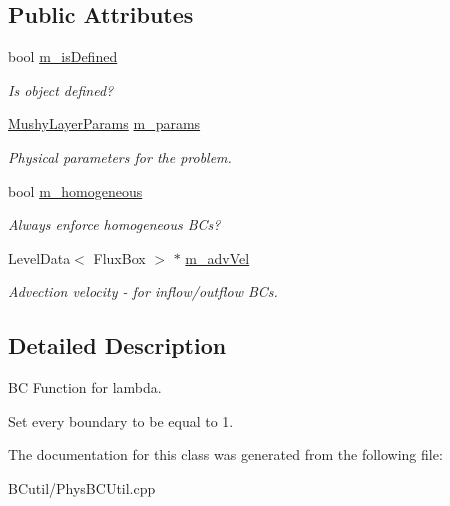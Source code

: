 \subsection*{Public Attributes}
\begin{DoxyCompactItemize}
\item 
\hypertarget{class_basic_lambda_b_c_function_a435d33b4522b5a631755ede6bb4ade87}{bool \hyperlink{class_basic_lambda_b_c_function_a435d33b4522b5a631755ede6bb4ade87}{m\-\_\-is\-Defined}}\label{class_basic_lambda_b_c_function_a435d33b4522b5a631755ede6bb4ade87}

\begin{DoxyCompactList}\small\item\em Is object defined? \end{DoxyCompactList}\item 
\hypertarget{class_basic_lambda_b_c_function_a3b85409a8499e163b6b175be43591e90}{\hyperlink{class_mushy_layer_params}{Mushy\-Layer\-Params} \hyperlink{class_basic_lambda_b_c_function_a3b85409a8499e163b6b175be43591e90}{m\-\_\-params}}\label{class_basic_lambda_b_c_function_a3b85409a8499e163b6b175be43591e90}

\begin{DoxyCompactList}\small\item\em Physical parameters for the problem. \end{DoxyCompactList}\item 
\hypertarget{class_basic_lambda_b_c_function_ad16425be3588ef0361d10d077e4b0b71}{bool \hyperlink{class_basic_lambda_b_c_function_ad16425be3588ef0361d10d077e4b0b71}{m\-\_\-homogeneous}}\label{class_basic_lambda_b_c_function_ad16425be3588ef0361d10d077e4b0b71}

\begin{DoxyCompactList}\small\item\em Always enforce homogeneous B\-Cs? \end{DoxyCompactList}\item 
\hypertarget{class_basic_lambda_b_c_function_a0eb73129c0a63cf57979d153125cbe11}{Level\-Data$<$ Flux\-Box $>$ $\ast$ \hyperlink{class_basic_lambda_b_c_function_a0eb73129c0a63cf57979d153125cbe11}{m\-\_\-adv\-Vel}}\label{class_basic_lambda_b_c_function_a0eb73129c0a63cf57979d153125cbe11}

\begin{DoxyCompactList}\small\item\em Advection velocity -\/ for inflow/outflow B\-Cs. \end{DoxyCompactList}\end{DoxyCompactItemize}


\subsection{Detailed Description}
B\-C Function for lambda. 

Set every boundary to be equal to 1. 

The documentation for this class was generated from the following file\-:\begin{DoxyCompactItemize}
\item 
B\-Cutil/Phys\-B\-C\-Util.\-cpp\end{DoxyCompactItemize}
